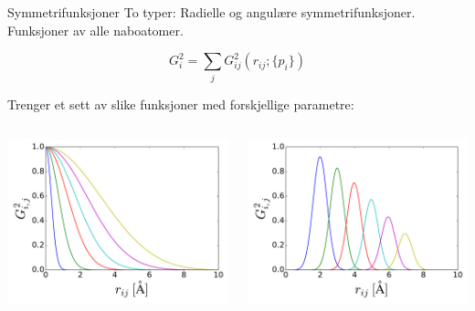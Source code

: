 \documentclass{beamer}
\begin{document}
\begin{frame}{Symmetrifunksjoner}
To typer: Radielle og angulære symmetrifunksjoner. \newline
Funksjoner av alle naboatomer. 

\begin{equation*}
 G_i^2 = \sum_j G_{ij}^2(r_{ij}; \{p_i\})
\end{equation*}
 
Trenger et sett av slike funksjoner med forskjellige parametre:
\newline
\begin{columns} %
  \begin{column}{0.5\linewidth} %
   \centering
   \includegraphics[width=\linewidth]{../Figures/Presentation/G2_1.pdf}
  \end{column}
  \begin{column}{0.5\linewidth} %
   \centering
   \includegraphics[width=\linewidth]{../Figures/Presentation/G2_2.pdf}
  \end{column}
\end{columns}

\end{frame}
\end{document}
